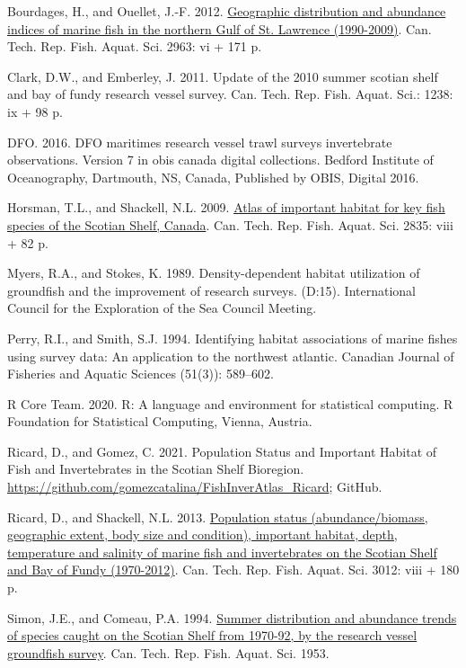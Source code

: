 \documentclass[12pt]{article}\usepackage[]{graphicx}\usepackage[]{color}
\begin{document}
\leavevmode\hypertarget{ref-Bourdages:NGatlas:2012}{}%
Bourdages, H., and Ouellet, J.-F. 2012. \href{http://publications.gc.ca/site/eng/425663/publication.html}{Geographic distribution and abundance indices of marine fish in the northern Gulf of St. Lawrence (1990-2009)}. Can. Tech. Rep. Fish. Aquat. Sci. 2963: vi + 171 p.

\leavevmode\hypertarget{ref-ClarkEmberley2011}{}%
Clark, D.W., and Emberley, J. 2011. Update of the 2010 summer scotian shelf and bay of fundy research vessel survey. Can. Tech. Rep. Fish. Aquat. Sci.: 1238: ix + 98 p.

\leavevmode\hypertarget{ref-DFO:2016}{}%
DFO. 2016. DFO maritimes research vessel trawl surveys invertebrate observations. Version 7 in obis canada digital collections. Bedford Institute of Oceanography, Dartmouth, NS, Canada, Published by OBIS, Digital 2016.

\leavevmode\hypertarget{ref-Horsman:atlas:2009}{}%
Horsman, T.L., and Shackell, N.L. 2009. \href{http://publications.gc.ca/site/eng/353896/publication.html}{Atlas of important habitat for key fish species of the Scotian Shelf, Canada}. Can. Tech. Rep. Fish. Aquat. Sci. 2835: viii + 82 p.

\leavevmode\hypertarget{ref-Myers:Stokes:1989}{}%
Myers, R.A., and Stokes, K. 1989. Density-dependent habitat utilization of groundfish and the improvement of research surveys. (D:15). International Council for the Exploration of the Sea Council Meeting.

\leavevmode\hypertarget{ref-Perry:Smith:1994:cjfas}{}%
Perry, R.I., and Smith, S.J. 1994. Identifying habitat associations of marine fishes using survey data: An application to the northwest atlantic. Canadian Journal of Fisheries and Aquatic Sciences (51(3)): 589--602.

\leavevmode\hypertarget{ref-R:2020}{}%
R Core Team. 2020. R: A language and environment for statistical computing. R Foundation for Statistical Computing, Vienna, Austria.

\leavevmode\hypertarget{ref-Ricard-Gomez-2021}{}%
Ricard, D., and Gomez, C. 2021. Population Status and Important Habitat of Fish and Invertebrates in the Scotian Shelf Bioregion. \url{https://github.com/gomezcatalina/FishInverAtlas_Ricard}; GitHub.

\leavevmode\hypertarget{ref-Ricard:MARatlas:2013}{}%
Ricard, D., and Shackell, N.L. 2013. \href{http://publications.gc.ca/site/eng/9.589947/publication.html}{Population status (abundance/biomass, geographic extent, body size and condition), important habitat, depth, temperature and salinity of marine fish and invertebrates on the Scotian Shelf and Bay of Fundy (1970-2012)}. Can. Tech. Rep. Fish. Aquat. Sci. 3012: viii + 180 p.

\leavevmode\hypertarget{ref-Simon:Comeau:1994}{}%
Simon, J.E., and Comeau, P.A. 1994. \href{http://publications.gc.ca/site/eng/46517/publication.html}{Summer distribution and abundance trends of species caught on the Scotian Shelf from 1970-92, by the research vessel groundfish survey}. Can. Tech. Rep. Fish. Aquat. Sci. 1953.
\end{document}
